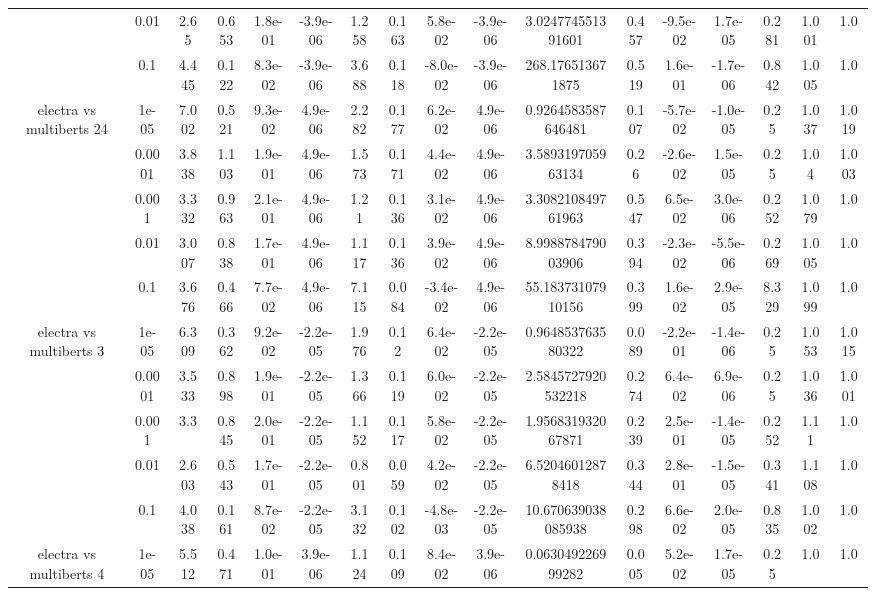 \begin{tabular}{|c|c|c|c|c|c|c|c|c|c|c|c|c|c|c|c|c|}
 & 0.01 & 2.65 & 0.653 & 1.8e-01 & -3.9e-06 & 1.258 & 0.163 & 5.8e-02 & -3.9e-06 & 3.024774551391601 & 0.457 & -9.5e-02 & 1.7e-05 & 0.281 & 1.001 & 1.0 \\
 & 0.1 & 4.445 & 0.122 & 8.3e-02 & -3.9e-06 & 3.688 & 0.118 & -8.0e-02 & -3.9e-06 & 268.176513671875 & 0.519 & 1.6e-01 & -1.7e-06 & 0.842 & 1.005 & 1.0 \\
\hline
\multirow{5}{*}{electra  vs multiberts 24} & 1e-05 & 7.002 & 0.521 & 9.3e-02 & 4.9e-06 & 2.282 & 0.177 & 6.2e-02 & 4.9e-06 & 0.9264583587646481 & 0.107 & -5.7e-02 & -1.0e-05 & 0.25 & 1.037 & 1.019 \\
 & 0.0001 & 3.838 & 1.103 & 1.9e-01 & 4.9e-06 & 1.573 & 0.171 & 4.4e-02 & 4.9e-06 & 3.589319705963134 & 0.26 & -2.6e-02 & 1.5e-05 & 0.25 & 1.04 & 1.003 \\
 & 0.001 & 3.332 & 0.963 & 2.1e-01 & 4.9e-06 & 1.21 & 0.136 & 3.1e-02 & 4.9e-06 & 3.308210849761963 & 0.547 & 6.5e-02 & 3.0e-06 & 0.252 & 1.079 & 1.0 \\
 & 0.01 & 3.007 & 0.838 & 1.7e-01 & 4.9e-06 & 1.117 & 0.136 & 3.9e-02 & 4.9e-06 & 8.998878479003906 & 0.394 & -2.3e-02 & -5.5e-06 & 0.269 & 1.005 & 1.0 \\
 & 0.1 & 3.676 & 0.466 & 7.7e-02 & 4.9e-06 & 7.115 & 0.084 & -3.4e-02 & 4.9e-06 & 55.18373107910156 & 0.399 & 1.6e-02 & 2.9e-05 & 8.329 & 1.099 & 1.0 \\
\hline
\multirow{5}{*}{electra  vs multiberts 3} & 1e-05 & 6.309 & 0.362 & 9.2e-02 & -2.2e-05 & 1.976 & 0.12 & 6.4e-02 & -2.2e-05 & 0.964853763580322 & 0.089 & -2.2e-01 & -1.4e-06 & 0.25 & 1.053 & 1.015 \\
 & 0.0001 & 3.533 & 0.898 & 1.9e-01 & -2.2e-05 & 1.366 & 0.119 & 6.0e-02 & -2.2e-05 & 2.5845727920532218 & 0.274 & 6.4e-02 & 6.9e-06 & 0.25 & 1.036 & 1.001 \\
 & 0.001 & 3.3 & 0.845 & 2.0e-01 & -2.2e-05 & 1.152 & 0.117 & 5.8e-02 & -2.2e-05 & 1.956831932067871 & 0.239 & 2.5e-01 & -1.4e-05 & 0.252 & 1.11 & 1.0 \\
 & 0.01 & 2.603 & 0.543 & 1.7e-01 & -2.2e-05 & 0.801 & 0.059 & 4.2e-02 & -2.2e-05 & 6.52046012878418 & 0.344 & 2.8e-01 & -1.5e-05 & 0.341 & 1.108 & 1.0 \\
 & 0.1 & 4.038 & 0.161 & 8.7e-02 & -2.2e-05 & 3.132 & 0.102 & -4.8e-03 & -2.2e-05 & 10.670639038085938 & 0.298 & 6.6e-02 & 2.0e-05 & 0.835 & 1.002 & 1.0 \\
\hline
\multirow{5}{*}{electra  vs multiberts 4} & 1e-05 & 5.512 & 0.471 & 1.0e-01 & 3.9e-06 & 1.124 & 0.109 & 8.4e-02 & 3.9e-06 & 0.063049226999282 & 0.005 & 5.2e-02 & 1.7e-05 & 0.25 & 1.0 & 1.0 \\

\end{tabular}
